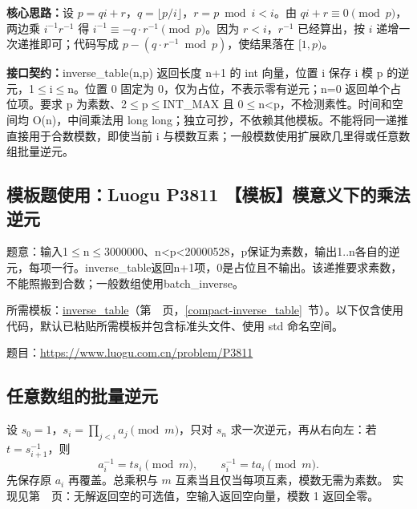 \textbf{核心思路：}\allowbreak 设 $p=qi+r$，$q=\lfloor p/i\rfloor$，$r=p\bmod i<i$。由 $qi+r\equiv0\pmod p$，两边乘 $i^{-1}r^{-1}$ 得 $i^{-1}\equiv-q\cdot r^{-1}\pmod p$。因为 $r<i$，$r^{-1}$ 已经算出，按 $i$ 递增一次递推即可；代码写成 $p-(q\cdot r^{-1}\bmod p)$，使结果落在 $[1,p)$。



{\sloppy{}\noindent\textbf{接口契约：}inverse\_table(n,p) 返回长度 n+1 的 int 向量，位置 i 保存 i 模 p 的逆元，1$\le$i$\le$n。位置 0 固定为 0，仅为占位，不表示零有逆元；n=0 返回单个占位项。要求 p 为素数、2$\le$p$\le$INT\_MAX 且 0$\le$n<p，不检测素性。时间和空间均 O(n)，中间乘法用 long long；独立可抄，不依赖其他模板。不能将同一递推直接用于合数模数，即使当前 i 与模数互素；一般模数使用扩展欧几里得或任意数组批量逆元。\par}



\Needspace{267pt}

\subsection*{模板题使用：Luogu P3811 【模板】模意义下的乘法逆元}

\label{usage-example-196}

题意：输入1$\le$n$\le$3000000、n<p<20000528，p保证为素数，输出1..n各自的逆元，每项一行。inverse\_table返回n+1项，0是占位且不输出。该递推要求素数，不能照搬到合数；一般数组使用batch\_inverse。

所需模板：\hyperref[compact-inverse_table]{inverse\_\allowbreak{}table}（第~\pageref{compact-inverse_table}~页，\ref{compact-inverse_table}~节）。以下仅含使用代码，默认已粘贴所需模板并包含标准头文件、使用 std 命名空间。

题目：\url{https://www.luogu.com.cn/problem/P3811}



\subsection{任意数组的批量逆元}\label{knowledge-batch-inverse}
设 $s_0=1$，$s_i=\prod_{j<i}a_j\pmod m$，只对 $s_n$ 求一次逆元，再从右向左：若 $t=s_{i+1}^{-1}$，则
\[
a_i^{-1}=t s_i\pmod m,\qquad s_i^{-1}=t a_i\pmod m.
\]
先保存原 $a_i$ 再覆盖。总乘积与 $m$ 互素当且仅当每项互素，模数无需为素数。
实现见第~\pageref{compact-batch_inverse}~页：无解返回空的可选值，空输入返回空向量，模数 1 返回全零。



